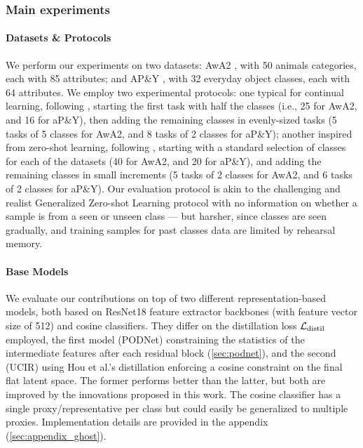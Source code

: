 \subsubsection{Main experiments}
\label{sec:ghost_quantitative}

\paragraph{Datasets \& Protocols} We perform our experiments on two datasets: AwA2
\citet{xian2019awa2}, with 50 animals categories, each with 85 attributes; and AP\&Y
\citet{farhadi2009apy}, with 32 everyday object classes, each with 64 attributes. We employ two
experimental protocols: one typical for continual learning, following
\citet{hou2019ucir,douillard2020podnet}, starting the first task with half the classes (i.e., 25 for
AwA2, and 16 for aP\&Y), then adding the remaining classes in evenly-sized tasks (5 tasks of 5
classes for AwA2, and 8 tasks of 2 classes for aP\&Y); another inspired from zero-shot learning,
following \citet{xian2019awa2}, starting with a standard selection of classes for each of the
datasets (40 for AwA2, and 20 for aP\&Y), and adding the remaining classes in small increments (5
tasks of 2 classes for AwA2, and 6 tasks of 2 classes for aP\&Y). Our evaluation protocol is akin to
the challenging and realist Generalized Zero-shot Learning \citep{scheirer2013generalizedzeroshot,
    chao2016generalizedzeroshot} protocol with no information on whether a sample is from a seen or
unseen class — but harsher, since classes are seen gradually, and training samples for past classes
data are limited by rehearsal memory.

\paragraph{Base Models} We evaluate our contributions on top of two different representation-based
models, both based on ResNet18 \citep{he2016resnet} feature extractor backbones (with feature vector
size of 512) and cosine classifiers. They differ on the distillation loss $\mathcal{L}_\text{distil}$
employed, the first model (PODNet) constraining the statistics of the intermediate features after
each residual block (\autoref{sec:podnet}), and the second (UCIR) using Hou et al.'s distillation
\citep{hou2019ucir} enforcing a cosine constraint on the final flat latent space. The former
performs better than the latter, but both are improved by the innovations proposed in this work. The
cosine classifier has a single proxy/representative per class but could easily be generalized to
multiple proxies. Implementation details are provided in the appendix
(\autoref{sec:appendix_ghost}).


